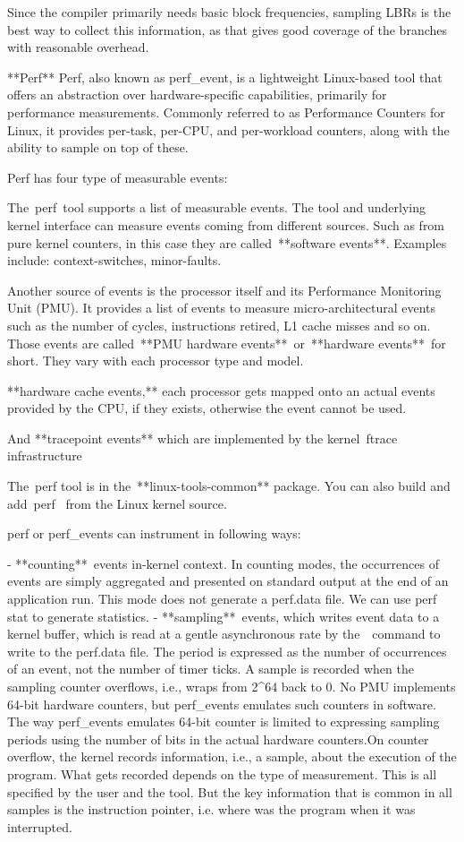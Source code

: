 Since the compiler primarily needs basic block frequencies, sampling LBRs is the best way to collect this information, as that gives good coverage of the branches with reasonable overhead. 

**Perf**
Perf, also known as perf_event, is a lightweight Linux-based tool that offers an abstraction over hardware-specific capabilities, primarily for performance measurements. Commonly referred to as Performance Counters for Linux, it provides per-task, per-CPU, and per-workload counters, along with the ability to sample on top of these.

Perf has four type of measurable events:

The perf tool supports a list of measurable events. The tool and underlying kernel interface can measure events coming from different sources. Such as from pure kernel counters, in this case they are called **software events**. Examples include: context-switches, minor-faults.

Another source of events is the processor itself and its Performance Monitoring Unit (PMU). It provides a list of events to measure micro-architectural events such as the number of cycles, instructions retired, L1 cache misses and so on. Those events are called **PMU hardware events** or **hardware events** for short. They vary with each processor type and model.

**hardware cache events,** each processor gets mapped onto an actual events provided by the CPU, if they exists, otherwise the event cannot be used.

And **tracepoint events** which are implemented by the kernel ftrace infrastructure

The perf tool is in the **linux-tools-common** package. You can also build and add perf
 from the Linux kernel source.

perf or perf_events can instrument in following ways:

- **counting** events in-kernel context. In counting modes, the occurrences of events are simply aggregated and presented on standard output at the end of an application run. This mode does not generate a perf.data file. We can use perf stat to generate statistics.
- **sampling** events, which writes event data to a kernel buffer, which is read at a gentle asynchronous rate by the  command to write to the perf.data file. The period is expressed as the number of occurrences of an event, not the number of timer ticks. A sample is recorded when the sampling counter overflows, i.e., wraps from 2^64 back to 0. No PMU implements 64-bit hardware counters, but perf_events emulates such counters in software. The way perf_events emulates 64-bit counter is limited to expressing sampling periods using the number of bits in the actual hardware counters.On counter overflow, the kernel records information, i.e., a sample, about the execution of the program. What gets recorded depends on the type of measurement. This is all specified by the user and the tool. But the key information that is common in all samples is the instruction pointer, i.e. where was the program when it was interrupted.
    
